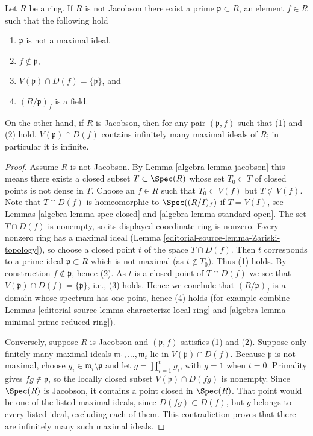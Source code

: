 \begin{lemma}
\label{editorial-source-lemma-characterize-jacobson}
Let $R$ be a ring. If $R$ is not Jacobson there exist
a prime $\mathfrak p \subset R$, an element $f \in R$
such that the following hold
\begin{enumerate}
\item $\mathfrak p$ is not a maximal ideal,
\item $f \not \in \mathfrak p$,
\item $V(\mathfrak p) \cap D(f) = \{\mathfrak p\}$, and
\item $(R/\mathfrak p)_f$ is a field.
\end{enumerate}
On the other hand, if $R$ is Jacobson, then for any pair $(\mathfrak p, f)$
such that (1) and (2) hold, $V(\mathfrak p)\cap D(f)$ contains
infinitely many maximal ideals of $R$; in particular it is infinite.
\end{lemma}

\begin{proof}
Assume $R$ is not Jacobson.
By Lemma \ref{algebra-lemma-jacobson} this means there exists a
closed subset $T \subset \Spec(R)$
whose set $T_0 \subset T$ of closed points is not dense in $T$.
Choose an $f \in R$ such that $T_0 \subset V(f)$ but
$T \not \subset V(f)$. Note that $T \cap D(f)$
is homeomorphic to $\Spec((R/I)_f)$ if $T = V(I)$, see
Lemmas \ref{algebra-lemma-spec-closed} and \ref{algebra-lemma-standard-open}.
The set $T\cap D(f)$ is nonempty, so its displayed coordinate ring
is nonzero. Every nonzero ring has a maximal ideal
(Lemma \ref{editorial-source-lemma-Zariski-topology}), so choose a closed point $t$
of the space $T\cap D(f)$. Then $t$ corresponds to a prime ideal
$\mathfrak p \subset R$ which is not maximal (as $t \not \in T_0$).
Thus (1) holds. By construction $f \not \in \mathfrak p$, hence (2).
As $t$ is a closed point of $T \cap D(f)$ we see that
$V(\mathfrak p) \cap D(f) = \{\mathfrak p\}$, i.e., (3) holds. Hence we
conclude that $(R/\mathfrak p)_f$ is a domain whose
spectrum has one point, hence (4) holds
(for example combine Lemmas \ref{editorial-source-lemma-characterize-local-ring} and
\ref{algebra-lemma-minimal-prime-reduced-ring}).

\medskip\noindent
Conversely, suppose $R$ is Jacobson and $(\mathfrak p,f)$ satisfies
(1) and (2). Suppose only finitely many maximal ideals
$\mathfrak m_1,\ldots,\mathfrak m_t$ lie in
$V(\mathfrak p)\cap D(f)$. Because $\mathfrak p$ is not maximal,
choose $g_i\in\mathfrak m_i\setminus\mathfrak p$ and let
$g=\prod_{i=1}^t g_i$, with $g=1$ when $t=0$.
Primality gives $fg\notin\mathfrak p$, so the locally closed subset
$V(\mathfrak p)\cap D(fg)$ is nonempty. Since $\Spec(R)$ is Jacobson,
it contains a point closed in $\Spec(R)$. That point would be one of
the listed maximal ideals, since $D(fg)\subset D(f)$, but $g$ belongs
to every listed ideal, excluding each of them. This contradiction
proves that there are infinitely many such maximal ideals.
\end{proof}